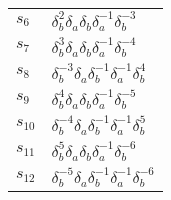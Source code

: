 \documentclass{article}
\begin{document}
\begin{center}
\begin{tabular}{ll}
$s_{6}$ & $\delta_b^{2}\delta_a^{}\delta_b^{}\delta_a^{-1}\delta_b^{-3}$ \\
$s_{7}$ & $\delta_b^{3}\delta_a^{}\delta_b^{}\delta_a^{-1}\delta_b^{-4}$ \\
$s_{8}$ & $\delta_b^{-3}\delta_a^{}\delta_b^{-1}\delta_a^{-1}\delta_b^{4}$ \\
$s_{9}$ & $\delta_b^{4}\delta_a^{}\delta_b^{}\delta_a^{-1}\delta_b^{-5}$ \\
$s_{10}$ & $\delta_b^{-4}\delta_a^{}\delta_b^{-1}\delta_a^{-1}\delta_b^{5}$ \\
$s_{11}$ & $\delta_b^{5}\delta_a^{}\delta_b^{}\delta_a^{-1}\delta_b^{-6}$ \\
$s_{12}$ & $\delta_b^{-5}\delta_a^{}\delta_b^{-1}\delta_a^{-1}\delta_b^{-6}$ \\
\bottomrule
\end{tabular}
\end{center}

\thispagestyle{empty}
\end{document}
